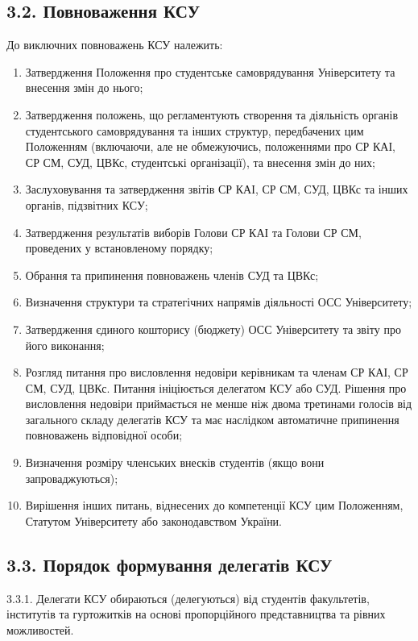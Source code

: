 \subsection*{3.2. Повноваження КСУ}
    До виключних повноважень КСУ належить:
        \begin{enumerate}[label=\alph*)]
            \item Затвердження Положення про студентське самоврядування Університету та внесення змін до нього;
            \item Затвердження положень, що регламентують створення та діяльність органів студентського самоврядування та інших структур, передбачених цим Положенням (включаючи, але не обмежуючись, положеннями про СР КАІ, СР СМ, СУД, ЦВКс, студентські організації), та внесення змін до них;
            \item Заслуховування та затвердження звітів СР КАІ, СР СМ, СУД, ЦВКс та інших органів, підзвітних КСУ;
            \item Затвердження результатів виборів Голови СР КАІ та Голови СР СМ, проведених у встановленому порядку;
            \item Обрання та припинення повноважень членів СУД та ЦВКс;
            \item Визначення структури та стратегічних напрямів діяльності ОСС Університету;
            \item Затвердження єдиного кошторису (бюджету) ОСС Університету та звіту про його виконання;
            \item Розгляд питання про висловлення недовіри керівникам та членам СР КАІ, СР СМ, СУД, ЦВКс. Питання ініціюється делегатом КСУ або СУД. Рішення про висловлення недовіри приймається не менше ніж двома третинами голосів від загального складу делегатів КСУ та має наслідком автоматичне припинення повноважень відповідної особи;
            \item Визначення розміру членських внесків студентів (якщо вони запроваджуються);
            \item Вирішення інших питань, віднесених до компетенції КСУ цим Положенням, Статутом Університету або законодавством України.
        \end{enumerate}

\subsection*{3.3. Порядок формування делегатів КСУ}
    3.3.1. Делегати КСУ обираються (делегуються) від студентів факультетів, інститутів та гуртожитків на основі пропорційного представництва та рівних можливостей.

